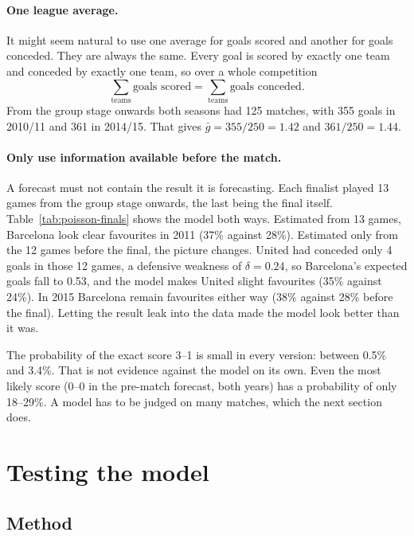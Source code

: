 \documentclass[11pt,a4paper]{article}
\begin{document}
\paragraph{One league average.} It might seem natural to use one average for goals scored and another for goals conceded. They are always the same. Every goal is scored by exactly one team and conceded by exactly one team, so over a whole competition
\[
\sum_{\text{teams}} \text{goals scored} = \sum_{\text{teams}} \text{goals conceded}.
\]
From the group stage onwards both seasons had 125 matches, with 355 goals in 2010/11 and 361 in 2014/15. That gives $\bar g = 355/250 = 1.42$ and $361/250 = 1.44$.

\paragraph{Only use information available before the match.} A forecast must not contain the result it is forecasting. Each finalist played 13 games from the group stage onwards, the last being the final itself. Table~\ref{tab:poisson-finals} shows the model both ways. Estimated from 13 games, Barcelona look clear favourites in 2011 (37\% against 28\%). Estimated only from the 12 games before the final, the picture changes. United had conceded only 4 goals in those 12 games, a defensive weakness of $\delta = 0.24$, so Barcelona's expected goals fall to 0.53, and the model makes United slight favourites (35\% against 24\%). In 2015 Barcelona remain favourites either way (38\% against 28\% before the final). Letting the result leak into the data made the model look better than it was.



The probability of the exact score 3--1 is small in every version: between 0.5\% and 3.4\%. That is not evidence against the model on its own. Even the most likely score (0--0 in the pre-match forecast, both years) has a probability of only 18--29\%. A model has to be judged on many matches, which the next section does.

\section{Testing the model}\label{sec:test}

\subsection{Method}
\end{document}
